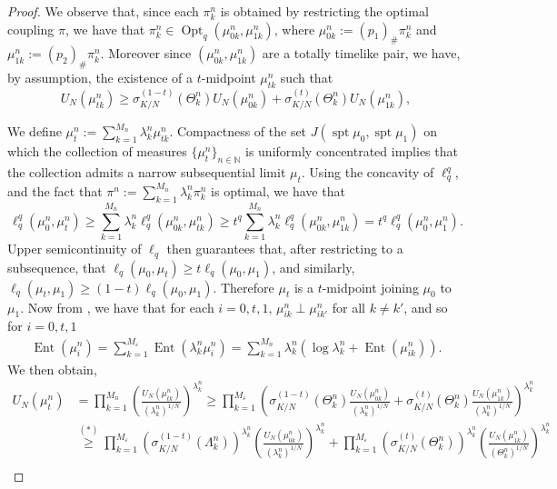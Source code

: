 \documentclass{article}
\renewcommand{\epsilon}{\varepsilon}
\newcommand{\N}{\mathbb{N}}
\DeclareMathOperator{\spt}{spt}
\DeclareMathOperator{\Opt}{Opt}
\DeclareMathOperator{\Ent}{Ent}
\theoremstyle{definition}
\begin{document}
{\begin{proof}
We observe that, since each $\pi_k^n$ is obtained by restricting the optimal coupling $\pi$, we have that $\pi_k^n\in \Opt_q(\mu_{0k}^n, \mu_{1k}^n)$, where $\mu_{0k}^n:=(p_1)_\# \pi_k^n$ and $\mu_{1k}^n:=(p_2)_\# \pi_k^n$. Moreover since $(\mu_{0k}^n,\mu_{1k}^n)$ are a totally timelike pair, we have, by assumption, the existence of a $t$-midpoint $\mu_{tk}^n$ such that 
\[U_N(\mu_{tk}^n)\geq \sigma_{K/N}^{(1-t)}(\Theta_k^n)U_N(\mu_{0k}^n)+\sigma_{K/N}^{(t)}(\Theta_k^n)U_N(\mu_{1k}^n),\]

We define $\mu_t^n:= \sum_{k=1}^{M_n} \lambda_k^n \mu_{tk}^n$. Compactness of the set $J(\spt\mu_0,\spt\mu_1)$ on which the collection of measures $\{\mu_t^n\}_{n\in \N}$ is uniformly concentrated implies that the collection admits a narrow subsequential limit $\mu_t$. Using the concavity of $\ell_q^q$, and the fact that $\pi^n:= \sum_{k=1}^{M_n}\lambda_k^n \pi_k^n$ is optimal, we have that 
\[\ell_q^q(\mu_0^n, \mu_t^n) \geq \sum_{k=1}^{M_n} \lambda_k^n \ell_q^q(\mu_{0k}^n, \mu_{tk}^n) \geq t^q \sum_{k=1}^{M_n}\lambda_k^n \ell_q^q(\mu_{0k}^n, \mu_{1k}^n)= t^q\ell_q^q(\mu_0^n, \mu_1^n).\]
Upper semicontinuity of $\ell_q$ then guarantees that, after restricting to a subsequence, that $\ell_q(\mu_0,\mu_t)\geq t\ell_q(\mu_0, \mu_1)$, and similarly, $\ell_q(\mu_t,\mu_1)\geq (1-t)\ell_q(\mu_0,\mu_1)$. Therefore $\mu_t$ is a $t$-midpoint joining $\mu_0$ to $\mu_1$. Now from , we have that for each $i=0,t,1$, $\mu_{ik}^n\perp \mu_{ik'}^n$ for all $k\neq k'$, and so for $i=0,t,1$
\begin{align}\label{linearityofEnt}
\Ent(\mu_i^n) = \sum_{k=1}^{M_\epsilon} \Ent(\lambda_k^n \mu_i^n)=\sum_{k=1}^{M_n} \lambda_k^n \left(\log\lambda_k^n + \Ent(\mu_{ik}^n)\right).
\end{align}
We then obtain, 
\begin{align*}
U_N(\mu_t^n) &= \prod_{k=1}^{M_n} \left(\frac{ U_N(\mu_{tk}^n)}{(\lambda_k^n)^{1/N}}\right)^{\lambda_k^n}\geq \prod_{k=1}^{M_\epsilon} \left(\sigma_{K/N}^{(1-t)}(\Theta_k^n)\frac{U_N(\mu_{0k}^n)}{(\lambda_k^n)^{1/N}}+\sigma_{K/N}^{(t)}(\Theta_k^n)\frac{U_N(\mu_{1k}^n)}{(\lambda_k^n)^{1/N}}\right)^{\lambda_k^n}\\ 
&\overset{(*)}{\geq} \prod_{k=1}^{M_\epsilon} \left(\sigma_{K/N}^{(1-t)}(\Lambda_k^n)\right)^{\lambda_k^n}\left(\frac{ U_N(\mu_{0k}^n)}{(\lambda_k^n)^{1/N}}\right)^{\lambda_k^n}+ \prod_{k=1}^{M_\epsilon} \left(\sigma_{K/N}^{(t)}(\Theta_k^n)\right)^{\lambda_k^n}\left(\frac{ U_N(\mu_{1k}^n)}{(\Theta_k^n)^{1/N}}\right)^{\lambda_k^n}\\ 

\end{align*}
\end{proof}}
\end{document}

